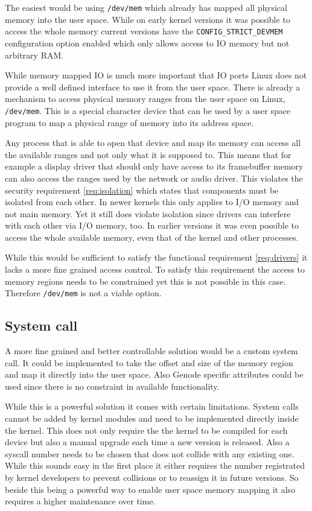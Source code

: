 \documentclass[
a4paper,
12pt,
notitlepage,
parskip=half,
DIV=11,
]{scrbook}
\begin{document}
		The easiest would be using \texttt{/dev/mem} which already has mapped all physical memory into the user space.
		While on early kernel versions it was possible to access the whole memory current versions have the \texttt{CONFIG\_STRICT\_DEVMEM} configuration option enabled which only allows access to IO memory but not arbitrary RAM.
		
		While memory mapped IO is much more important that IO ports Linux does not provide a well defined interface to use it from the user space.
		There is already a mechanism to access physical memory ranges from the user space on Linux, \texttt{/dev/mem}.
		This is a special character device that can be used by a user space program to map a physical range of memory into its address space. \citep{devmem}
		
		Any process that is able to open that device and map its memory can access all the available ranges and not only what it is supposed to.
		This means that for example a display driver that should only have access to its framebuffer memory can also access the ranges used by the network or audio driver.
		This violates the security requirement \ref{req:isolation} which states that components must be isolated from each other.
		In newer kernels this only applies to I/O memory and not main memory.
		Yet it still does violate isolation since drivers can interfere with each other via I/O memory, too.
		In earlier versions it was even possible to access the whole available memory, even that of the kernel and other processes. \citep{devmem}
		
		While this would be sufficient to satisfy the functional requirement \ref{req:drivers} it lacks a more fine grained access control.
		To satisfy this requirement the access to memory regions needs to be constrained yet this is not possible in this case.
		Therefore \texttt{/dev/mem} is not a viable option.
		
		\subsection{System call}
		
		A more fine grained and better controllable solution would be a custom system call.
		It could be implemented to take the offset and size of the memory region and map it directly into the user space.
		Also Genode specific attributes could be used since there is no constraint in available functionality.
		
		While this is a powerful solution it comes with certain limitations.
		System calls cannot be added by kernel modules and need to be implemented directly inside the kernel.
		This does not only require the the kernel to be compiled for each device but also a manual upgrade each time a new version is released.
		Also a syscall number needs to be chosen that does not collide with any existing one.
		While this sounds easy in the first place it either requires the number registrated by kernel developers to prevent collisions or to reassign it in future versions.
		So beside this being a powerful way to enable user space memory mapping it also requires a higher maintenance over time. \citep{syscall}
		
\end{document}
